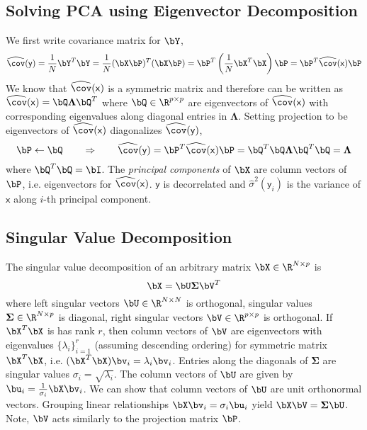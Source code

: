 \documentclass[11pt]{article}
\newcommand\ry{\ensuremath{\mathsf{y}}}
\newcommand\rx{\ensuremath{\mathsf{x}}}
\begin{document}
\subsection{Solving PCA using Eigenvector Decomposition}

We first write covariance matrix for $\bY$,
\[
    \widehat{\cov}(\ry)
    = \frac{1}{N} \bY^T \bY
    = \frac{1}{N} (\bX\bP)^T (\bX\bP)
    = \bP^T \left( \frac{1}{N} \bX^T\bX \right) \bP
    = \bP^T \widehat{\cov}(\rx) \bP
\]
We know that $\widehat{\cov}(\rx)$ is a symmetric matrix and therefore can be written as $\widehat{\cov}(\rx) = \bQ \boldsymbol{\Lambda} \bQ^T$ where $\bQ \in \R^{p\times p}$ are eigenvectors of $\widehat{\cov}(\rx)$ with corresponding eigenvalues along diagonal entries in $\boldsymbol{\Lambda}$. Setting projection to be eigenvectors of $\widehat{\cov}(\rx)$ diagonalizes $\widehat{\cov}(\ry)$,
\[
    \bP \leftarrow \bQ
    \quad\quad \Rightarrow \quad\quad
    \widehat{\cov}(\ry)
    = \bP^T \widehat{\cov}(\rx) \bP
    = \bQ^T \bQ \boldsymbol{\Lambda} \bQ^T \bQ
    = \boldsymbol{\Lambda} 
\]
where $\bQ^T\bQ = \bI$. The \textit{principal components} of $\bX$ are column vectors of $\bP$, i.e. eigenvectors for $\widehat{\cov}(\rx)$. $\ry$ is decorrelated and $\hat{\sigma}^2(\ry_i)$ is the variance of $\rx$ along $i$-th principal component.

\subsection{Singular Value Decomposition}


The singular value decomposition of an arbitrary matrix $\bX \in \R^{N\times p}$ is
\[
    \bX = \bU \boldsymbol{\Sigma} \bV^T
\]
where left singular vectors $\bU \in \R^{N\times N}$ is orthogonal, singular values $\boldsymbol{\Sigma} \in \R^{N\times p}$ is diagonal, right singular vectors $\bV \in \R^{p\times p}$ is orthogonal. If $\bX^T\bX$ is has rank $r$, then column vectors of $\bV$ are eigenvectors with eigenvalues $\{\lambda_i\}_{i=1}^r$ (assuming descending ordering) for symmetric matrix $\bX^T\bX$, i.e. $(\bX^T\bX) \bv_i = \lambda_i \bv_i$. Entries along the diagonals of $\boldsymbol{\Sigma}$ are singular values $\sigma_i = \sqrt{\lambda_i}$. The column vectors of $\bU$ are given by $\bu_i = \frac{1}{\sigma_i} \bX \bv_i$. We can show that column vectors of $\bU$ are unit orthonormal vectors. Grouping linear relationships $\bX \bv_i = \sigma_i \bu_i$ yield $\bX \bV = \boldsymbol{\Sigma}\bU$. Note, $\bV$ acts similarly to the projection matrix $\bP$. 
\end{document}

